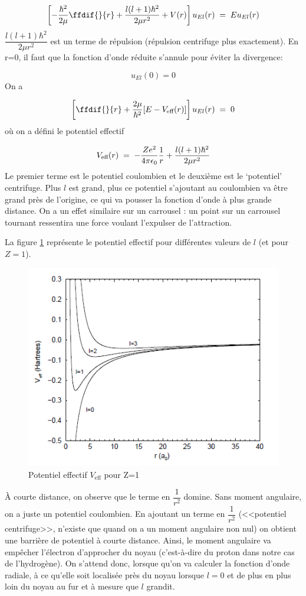 \[
    \left[-\dfrac{\hbar^2}{2\mu}\ffdif{}{r}+\dfrac{l(l+1)\hbar^2}{2 \mu r^2}+V(r)\right] u_{El}(r)\eq Eu_{El}(r)
\]
$\dfrac{l(l+1)\hbar^2}{2\mu r^2}$ est un terme de répulsion (répulsion centrifuge plus exactement). En r=0, il faut que la fonction d'onde réduite s'annule pour éviter la divergence:

\[u_{El}(0)=0\]
On a


\begin{equation}
    \left[\ffdif{}{r}+\dfrac{2\mu}{\hbar^2}[E-V_\text{eff}(r)]\right]u_{El}(r)\eq 0
    \label{jsp}
\end{equation}
où on a défini le potentiel effectif

\[
    V_\text{eff}(r)\; = \; -\dfrac{Ze^2}{4\pi \epsilon_0}\dfrac{1}{r}+\dfrac{l(l+1)\hbar^2}{2\mu r^2}
\]
Le premier terme est le potentiel coulombien et le deuxième est le `potentiel' centrifuge. Plus $l$ est grand, plus ce potentiel s'ajoutant au coulombien va être grand près de l'origine, ce qui va pousser la fonction d'onde à plus grande distance. On a un effet similaire sur un carrousel : un point sur un carrousel tournant ressentira une force voulant l'expulser de l'attraction.

La figure \ref{fig:potentieleffectif} représente le potentiel effectif pour différentes valeurs de $l$ (et pour $Z=1$).


\begin{figure}[htp]
    \centering
    \includegraphics[scale=0.80]{Images2/rad.PNG}
    \caption{Potentiel effectif $V_\text{eff}$ pour Z=1}
    \label{fig:potentieleffectif}
\end{figure}
À courte distance, on observe que le terme en $\dfrac{1}{r^2}$ domine. Sans moment angulaire, on a juste un potentiel coulombien. En ajoutant un terme en $\dfrac{1}{r^2}$ (<<potentiel centrifuge>>, n'existe que quand on a un moment angulaire non nul) on obtient une barrière de potentiel à courte distance. Ainsi, le moment angulaire va empêcher l'électron d'approcher du noyau (c'est-à-dire du proton dans notre cas de l'hydrogène). On s'attend donc, lorsque qu'on va calculer la fonction d'onde radiale, à ce qu'elle soit localisée près du noyau lorsque $l=0$ et de plus en plus loin du noyau au fur et à mesure que $l$ grandit.


